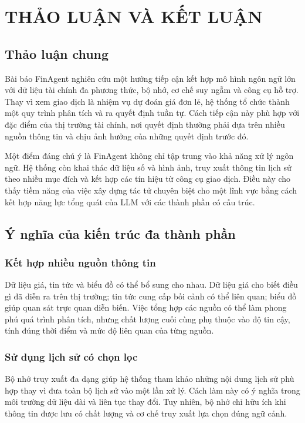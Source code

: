 \chapter{THẢO LUẬN VÀ KẾT LUẬN}

\section{Thảo luận chung}

Bài báo FinAgent nghiên cứu một hướng tiếp cận kết hợp mô hình ngôn ngữ lớn với dữ liệu tài chính đa phương thức, bộ nhớ, cơ chế suy ngẫm và công cụ hỗ trợ. Thay vì xem giao dịch là nhiệm vụ dự đoán giá đơn lẻ, hệ thống tổ chức thành một quy trình phân tích và ra quyết định tuần tự. Cách tiếp cận này phù hợp với đặc điểm của thị trường tài chính, nơi quyết định thường phải dựa trên nhiều nguồn thông tin và chịu ảnh hưởng của những quyết định trước đó.

Một điểm đáng chú ý là FinAgent không chỉ tập trung vào khả năng xử lý ngôn ngữ. Hệ thống còn khai thác dữ liệu số và hình ảnh, truy xuất thông tin lịch sử theo nhiều mục đích và kết hợp các tín hiệu từ công cụ giao dịch. Điều này cho thấy tiềm năng của việc xây dựng tác tử chuyên biệt cho một lĩnh vực bằng cách kết hợp năng lực tổng quát của LLM với các thành phần có cấu trúc.

\section{Ý nghĩa của kiến trúc đa thành phần}

\subsection{Kết hợp nhiều nguồn thông tin}
Dữ liệu giá, tin tức và biểu đồ có thể bổ sung cho nhau. Dữ liệu giá cho biết điều gì đã diễn ra trên thị trường; tin tức cung cấp bối cảnh có thể liên quan; biểu đồ giúp quan sát trực quan diễn biến. Việc tổng hợp các nguồn có thể làm phong phú quá trình phân tích, nhưng chất lượng cuối cùng phụ thuộc vào độ tin cậy, tính đúng thời điểm và mức độ liên quan của từng nguồn.

\subsection{Sử dụng lịch sử có chọn lọc}
Bộ nhớ truy xuất đa dạng giúp hệ thống tham khảo những nội dung lịch sử phù hợp thay vì đưa toàn bộ lịch sử vào một lần xử lý. Cách làm này có ý nghĩa trong môi trường dữ liệu dài và liên tục thay đổi. Tuy nhiên, bộ nhớ chỉ hữu ích khi thông tin được lưu có chất lượng và cơ chế truy xuất lựa chọn đúng ngữ cảnh.

